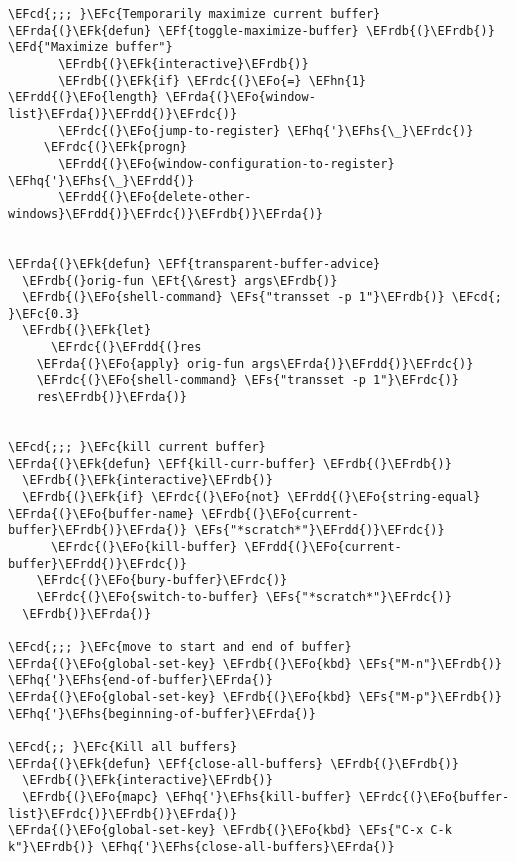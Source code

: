 \documentclass[a4wide,10pt]{article}
\newcommand{\EFc}[1]{\textcolor{EFc}{#1}} %
\newcommand{\EFcd}[1]{\textcolor{EFcd}{#1}} %
\newcommand{\EFs}[1]{\textcolor{EFs}{#1}} %
\newcommand{\EFd}[1]{\textcolor{EFd}{#1}} %
\newcommand{\EFk}[1]{\textcolor{EFk}{#1}} %
\newcommand{\EFf}[1]{\textcolor{EFf}{#1}} %
\newcommand{\EFt}[1]{\textcolor{EFt}{#1}} %
\newcommand{\EFo}[1]{\textcolor{EFo}{#1}} %
\newcommand{\EFhn}[1]{\textcolor{EFhn}{\textbf{#1}}} %
\newcommand{\EFhq}[1]{\textcolor{EFhq}{#1}} %
\newcommand{\EFhs}[1]{\textcolor{EFhs}{#1}} %
\newcommand{\EFrda}[1]{\textcolor{EFrda}{#1}} %
\newcommand{\EFrdb}[1]{\textcolor{EFrdb}{#1}} %
\newcommand{\EFrdc}[1]{\textcolor{EFrdc}{#1}} %
\newcommand{\EFrdd}[1]{\textcolor{EFrdd}{#1}} %
\begin{document}
\begin{Code}
\begin{Verbatim}
\EFcd{;;; }\EFc{Temporarily maximize current buffer}
\EFrda{(}\EFk{defun} \EFf{toggle-maximize-buffer} \EFrdb{(}\EFrdb{)} \EFd{"Maximize buffer"}
       \EFrdb{(}\EFk{interactive}\EFrdb{)}
       \EFrdb{(}\EFk{if} \EFrdc{(}\EFo{=} \EFhn{1} \EFrdd{(}\EFo{length} \EFrda{(}\EFo{window-list}\EFrda{)}\EFrdd{)}\EFrdc{)}
	   \EFrdc{(}\EFo{jump-to-register} \EFhq{'}\EFhs{\_}\EFrdc{)}
	 \EFrdc{(}\EFk{progn}
	   \EFrdd{(}\EFo{window-configuration-to-register} \EFhq{'}\EFhs{\_}\EFrdd{)}
	   \EFrdd{(}\EFo{delete-other-windows}\EFrdd{)}\EFrdc{)}\EFrdb{)}\EFrda{)}


\EFrda{(}\EFk{defun} \EFf{transparent-buffer-advice}
  \EFrdb{(}orig-fun \EFt{\&rest} args\EFrdb{)}
  \EFrdb{(}\EFo{shell-command} \EFs{"transset -p 1"}\EFrdb{)} \EFcd{; }\EFc{0.3}
  \EFrdb{(}\EFk{let}
      \EFrdc{(}\EFrdd{(}res
	\EFrda{(}\EFo{apply} orig-fun args\EFrda{)}\EFrdd{)}\EFrdc{)}
    \EFrdc{(}\EFo{shell-command} \EFs{"transset -p 1"}\EFrdc{)}
    res\EFrdb{)}\EFrda{)}


\EFcd{;;; }\EFc{kill current buffer}
\EFrda{(}\EFk{defun} \EFf{kill-curr-buffer} \EFrdb{(}\EFrdb{)}
  \EFrdb{(}\EFk{interactive}\EFrdb{)}
  \EFrdb{(}\EFk{if} \EFrdc{(}\EFo{not} \EFrdd{(}\EFo{string-equal} \EFrda{(}\EFo{buffer-name} \EFrdb{(}\EFo{current-buffer}\EFrdb{)}\EFrda{)} \EFs{"*scratch*"}\EFrdd{)}\EFrdc{)}
      \EFrdc{(}\EFo{kill-buffer} \EFrdd{(}\EFo{current-buffer}\EFrdd{)}\EFrdc{)}
    \EFrdc{(}\EFo{bury-buffer}\EFrdc{)}
    \EFrdc{(}\EFo{switch-to-buffer} \EFs{"*scratch*"}\EFrdc{)}
  \EFrdb{)}\EFrda{)}

\EFcd{;;; }\EFc{move to start and end of buffer}
\EFrda{(}\EFo{global-set-key} \EFrdb{(}\EFo{kbd} \EFs{"M-n"}\EFrdb{)} \EFhq{'}\EFhs{end-of-buffer}\EFrda{)}
\EFrda{(}\EFo{global-set-key} \EFrdb{(}\EFo{kbd} \EFs{"M-p"}\EFrdb{)} \EFhq{'}\EFhs{beginning-of-buffer}\EFrda{)}

\EFcd{;; }\EFc{Kill all buffers}
\EFrda{(}\EFk{defun} \EFf{close-all-buffers} \EFrdb{(}\EFrdb{)}
  \EFrdb{(}\EFk{interactive}\EFrdb{)}
  \EFrdb{(}\EFo{mapc} \EFhq{'}\EFhs{kill-buffer} \EFrdc{(}\EFo{buffer-list}\EFrdc{)}\EFrdb{)}\EFrda{)}
\EFrda{(}\EFo{global-set-key} \EFrdb{(}\EFo{kbd} \EFs{"C-x C-k k"}\EFrdb{)} \EFhq{'}\EFhs{close-all-buffers}\EFrda{)}


\end{Verbatim}
\end{Code}
\end{document}
